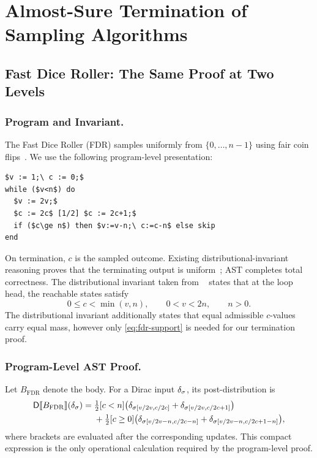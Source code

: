 \section{Almost-Sure Termination of Sampling Algorithms}
\label{sec:case-studies}

\subsection{Fast Dice Roller: The Same Proof at Two Levels}
\label{sec:fdr}

\subsubsection{Program and Invariant.}

The Fast Dice Roller (FDR) samples uniformly from $\{0,\ldots,n-1\}$ using fair coin flips~\cite{DBLP:journals/corr/abs-1304-1916}. We use the following program-level presentation:
\begin{lstlisting}[basicstyle=\ttfamily\small,mathescape=true,frame=single]
$v := 1;\ c := 0;$
while ($v<n$) do
  $v := 2v;$
  $c := 2c$ [1/2] $c := 2c+1;$
  if ($c\ge n$) then $v:=v-n;\ c:=c-n$ else skip
end
\end{lstlisting}
On termination, $c$ is the sampled outcome. Existing distributional-invariant reasoning proves that the terminating output is uniform~\cite{zilken2026verifyingsamplingalgorithmsdistributional}; AST completes total correctness. The distributional invariant taken from ~\cite{zilken2026verifyingsamplingalgorithmsdistributional} states that at the loop head, the reachable states satisfy
\begin{equation}
 0\le c<\min(v,n),\qquad 0<v<2n,\qquad n>0.
 \label{eq:fdr-support}
\end{equation}
The distributional invariant additionally states that equal admissible $c$-values carry equal mass, however only \eqref{eq:fdr-support} is needed for our termination proof.

\subsubsection{Program-Level AST Proof.}
Let $B_{\mathrm{FDR}}$ denote the body. For a Dirac input $\delta_{\sigma}$, its post-distribution is
\begin{align}
\mathsf{D}\llbracket B_{\mathrm{FDR}}\rrbracket(\delta_{\sigma})
={}&\tfrac12[c<n]\bigl(
 \delta_{\sigma[v/2v,c/2c]}+\delta_{\sigma[v/2v,c/2c+1]}\bigr)\notag\\
&+\tfrac12[c\geq0]\bigl(
 \delta_{\sigma[v/2v-n,c/2c-n]}+
 \delta_{\sigma[v/2v-n,c/2c+1-n]}\bigr),
\label{eq:fdr-post}
\end{align}
where brackets are evaluated after the corresponding updates. This compact expression is the only operational calculation required by the program-level proof.

